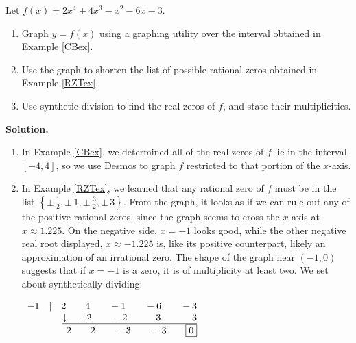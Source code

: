 \documentclass{ximera}
\begin{document}
\begin{example}  Let $f(x) = 2x^4+4x^3-x^2-6x-3$.  

\begin{enumerate}

\item  Graph $y=f(x)$ using a graphing utility over the interval  obtained in Example \ref{CBex}.

\item  Use the graph to shorten the list of possible rational zeros obtained in Example \ref{RZTex}.

\item  Use synthetic division to find the real zeros of $f$, and state their multiplicities.


\end{enumerate}

{\bf Solution.}

\begin{enumerate}

\item  In Example \ref{CBex}, we determined all of the real zeros of $f$ lie in the interval $[-4, 4]$, so we use Desmos to graph $f$ restricted to that portion of the $x$-axis.

\begin{center}
\end{center}


\item  In Example \ref{RZTex}, we learned that any rational zero of $f$ must be in the list $\left\{\pm \, \frac{1}{2}, \pm \, 1, \pm \, \frac{3}{2}, \pm \, 3\right\}$.  From the graph, it looks as if we can rule out any of the positive rational zeros, since the graph seems to cross the $x$-axis at $x \approx 1.225$.  On the negative side, $x=-1$ looks good, while the other negative real root displayed, $x \approx - 1.225$ is, like its positive counterpart,  likely an approximation of an irrational zero. The shape  of the graph near $(-1,0)$ suggests that if $x=-1$ is a zero, it is of multiplicity at least two.  We set about synthetically dividing:


\begin{center}
$
\begin{array}{r}
 -1 \quad |\quad 2 \quad\quad 4 \quad\quad -1 \quad\quad -6 \quad\quad -3\\
 \underline{\downarrow \quad -2 \quad\quad -2 \phantom{11}\quad\quad 3 \phantom{11.}\quad\quad 3}\\
 \quad \quad 2 \quad\quad 2 \quad\quad -3 \quad\quad -3 \quad\quad \fbox{0}
\end{array}
$    
\end{center}


\end{enumerate}
\end{example}
\end{document}
